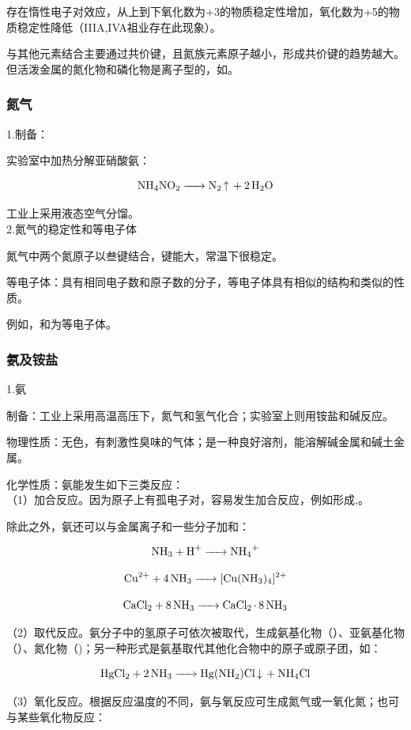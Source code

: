 \documentclass[a4paper,UTF8]{article}
\begin{document}
存在惰性电子对效应，从上到下氧化数为+3的物质稳定性增加，氧化数为+5的物质稳定性降低（IIIA,IVA祖业存在此现象）。

与其他元素结合主要通过共价键，且氮族元素原子越小，形成共价键的趋势越大。但活泼金属的氮化物和磷化物是离子型的，如。

\subsubsection{氮气}

1.制备：

实验室中加热分解亚硝酸氨：

$$ \ce{NH4NO2 -> N2 ^ + 2H2O} $$

工业上采用液态空气分馏。\\

2.氮气的稳定性和等电子体

氮气中两个氮原子以叁键结合，键能大，常温下很稳定。

等电子体：具有相同电子数和原子数的分子，等电子体具有相似的结构和类似的性质。

例如，和为等电子体。

\subsubsection{氨及铵盐}

1.氨

制备：工业上采用高温高压下，氮气和氢气化合；实验室上则用铵盐和碱反应。

物理性质：无色，有刺激性臭味的气体；是一种良好溶剂，能溶解碱金属和碱土金属。

化学性质：氨能发生如下三类反应：\\

（1）加合反应。因为原子上有孤电子对，容易发生加合反应，例如形成,。

除此之外，氨还可以与金属离子和一些分子加和：

$$ \ce{NH3 + H+ -> NH4+} $$

$$ \ce{Cu^2+ + 4NH3 -> [Cu(NH3)4]^2+} $$

$$ \ce{CaCl2 + 8NH3 -> CaCl2 * 8NH3} $$

（2）取代反应。氨分子中的氢原子可依次被取代，生成氨基化物（）、亚氨基化物（）、氮化物（)；另一种形式是氨基取代其他化合物中的原子或原子团，如：

$$ \ce{HgCl2 + 2NH3 -> Hg(NH2)Cl v + NH4Cl} $$

（3）氧化反应。根据反应温度的不同，氨与氧反应可生成氮气或一氧化氮；也可与某些氧化物反应：
\end{document}
